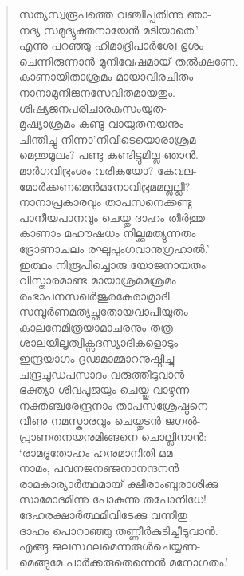 \begin{verse}
സത്യസ്വരൂപത്തെ വഞ്ചിപ്പതിന്നു ഞാ-\\
നദ്യ സമുദ്യുക്തനായേന്‍ മടിയാതെ.’\\
എന്നു പറഞ്ഞു ഹിമാദ്രിപാര്‍ശ്വേ ഭൃശം\\
ചെന്നിരുന്നാന്‍ മുനിവേഷമായ് തല്‍ക്ഷണേ.\\
കാണായിതാശ്രമം മായാവിരചിതം\\
നാനാമുനിജനസേവിതമായതും.\\
ശിഷ്യജനപരിചാരകസംയുത-\\
മൃഷ്യാശ്രമം കണ്ടു വായുതനയനും\\
ചിന്തിച്ചു നിന്നാ’നിവിടെയൊരാശ്രമ-\\
മെന്തുമൂലം? പണ്ടു കണ്ടിട്ടുമില്ല ഞാന്‍.\\
മാര്‍ഗവിഭ്രംശം വരികയോ? കേവല-\\
മോര്‍ക്കണമെന്‍മനോവിഭ്രമമല്ലല്ലീ?\\
നാനാപ്രകാരവും താപസനെക്കണ്ടു\\
പാനീയപാനവും ചെയ്തു ദാഹം തീര്‍ത്തു\\
കാണാം മഹൗഷധം നില്ക്കുമത്യുന്നതം\\
ദ്രോണാചലം രഘുപുംഗവാനുഗ്രഹാല്‍.’\\
ഇത്ഥം നിരൂപിച്ചൊരു യോജനായതം\\
വിസ്താരമാണ്ട മായാശ്രമമശ്രമം\\
രംഭാപനസഖര്‍ജൂരകേരാമ്രാദി\\
സമ്പൂര്‍ണമത്യച്ഛതോയവാപീയുതം\\
കാലനേമിത്രയാമാചരനും തത്ര\\
ശാലയിലൃത്വിക്സദസ്യാദികളൊടും\\
ഇന്ദ്രയാഗം ദൃഢമാമ്മാറനുഷ്ഠിച്ചു\\
ചന്ദ്രചൂഡപസാദം വരുത്തീടുവാന്‍\\
ഭക്ത്യാ ശിവപൂജയും ചെയ്തു വാഴുന്ന\\
നക്തഞ്ചരേന്ദ്രനാം താപസശ്രേഷ്ഠനെ\\
വീണു നമസ്കാരവും ചെയ്തുടന്‍ ജഗല്‍-\\
പ്രാണതനയനുമിങ്ങനെ ചൊല്ലിനാന്‍:\\
‘രാമദൂതോഹം ഹനുമാനിതി മമ\\
നാമം, പവനജനഞ്ജനാനന്ദനന്‍\\
രാമകാര്യാര്‍ത്ഥമായ് ക്ഷീരാംബുരാശിക്കു\\
സാമോദമിന്നു പോകുന്നു തപോനിധേ!\\
ദേഹരക്ഷാര്‍ത്ഥമിവിടേക്കു വന്നിതു\\
ദാഹം പൊറാഞ്ഞു തണ്ണീര്‍കുടിച്ചീടുവാന്‍.\\
എങ്ങു ജലസ്ഥലമെന്നരുള്‍ചെയ്യണ-\\
മെങ്ങുമേ പാര്‍ക്കരുതെന്നെന്‍ മനോഗതം.’\\

\end{verse}
